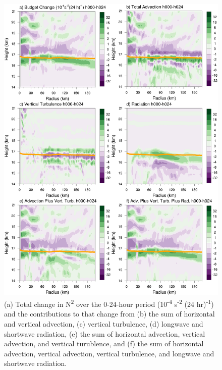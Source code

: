 \documentclass{ametsoc}
\begin{document}
\begin{figure}[ht]
\centerline{\includegraphics[width=27pc]{figures/h000-h024-budgetterms.png}}
\caption{(a) Total change in N\textsuperscript{2} over the 0-24-hour period (10\textsuperscript{-4} s\textsuperscript{-2} (24 hr)\textsuperscript{-1}) and the contributions to that change from (b) the sum of horizontal and vertical advection, (c) vertical turbulence, (d) longwave and shortwave radiation, (e) the sum of horizontal advection, vertical advection, and vertical turublence, and (f) the sum of horizontal advection, vertical advection, vertical turbulence, and longwave and shortwave radiation.}
\label{fig:stab-00-24}
\end{figure}
\end{document}
